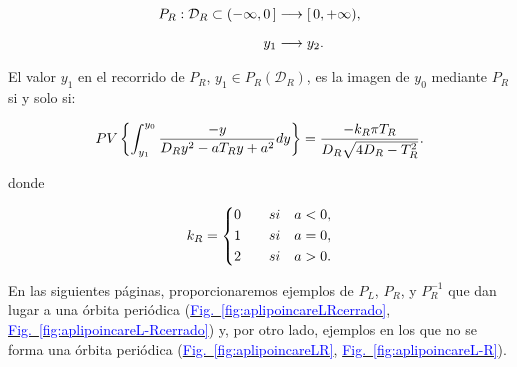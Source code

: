 \documentclass[12pt,a4paper]{report} %
\newcommand{\fref}[1]{\hyperref[#1]{\textcolor{blue}{Fig.~\ref*{#1}}}}
\begin{document}
	\begin{equation}
		\label{eq:dr}
		\scalebox{1}{$\displaystyle
			\begin{aligned}
				P_R:\mathcal{D}_R\subset (-\infty,0\,] &\longrightarrow [\,0, +\infty),\\[2mm]
				y_1 &\longrightarrow y_2.
			\end{aligned}
			$}
	\end{equation}\smallskip
	
	\noindent El valor $y_1$ en el recorrido de $P_R$, $y_1 \in P_R(\mathcal{D}_R)$, es la imagen de $y_0$ mediante $P_R$ si y solo si:
	
	\vspace{0.5cm}\begin{equation}
		\label{eq:caracr}
		\scalebox{1}{$\displaystyle
			PV\left\{\int_{y_1}^{y_0}\frac{-y}{D_Ry^2-aT_Ry+a^2}dy\right\}=\frac{-k_R\pi T_R}{D_R\sqrt{4D_R-T_R^2}}.
			$}
	\end{equation}\smallskip
	
	\noindent donde
	
	\begin{equation*}
		k_R=
		\label{eq:kr}
		\scalebox{1}{$\displaystyle
			\left\{
			\begin{aligned}
				0 \qquad si \quad a<0, \\
				1 \qquad si \quad a=0, \\
				2 \qquad si \quad a>0. 
			\end{aligned}
			\right. 
			$}
	\end{equation*}\smallskip
	
	\vspace{1cm} En las siguientes páginas, proporcionaremos ejemplos de $P_L$, $P_R$, y $P_R^{-1}$ que dan lugar a una órbita periódica (\fref{fig:aplipoincareLRcerrado}, \fref{fig:aplipoincareL-Rcerrado}) y, por otro lado, ejemplos en los que no se forma una órbita periódica (\fref{fig:aplipoincareLR}, \fref{fig:aplipoincareL-R}).
	
	\newpage
	
\end{document}
